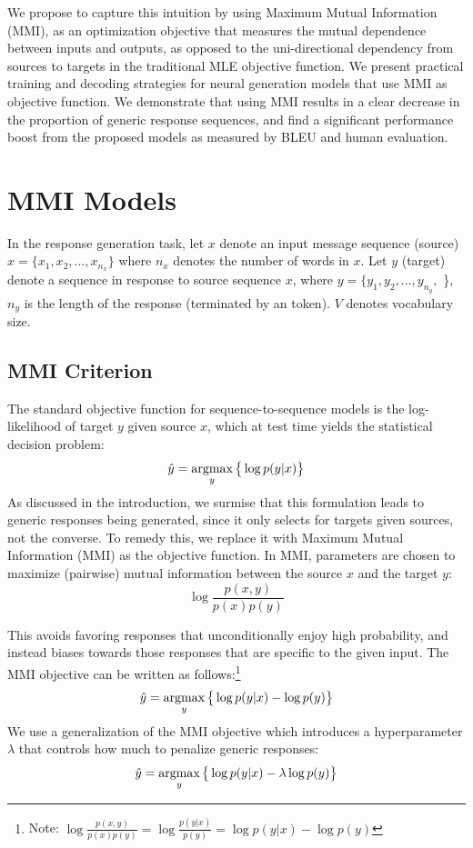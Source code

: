 We propose to capture this intuition by using Maximum Mutual Information (MMI), as an optimization objective that measures the mutual dependence between inputs and outputs, as opposed to 
the uni-directional dependency from sources to targets in the traditional MLE objective function.
We present practical training and decoding strategies for neural generation models that use MMI as objective function.
We demonstrate that using MMI results in a clear decrease in the proportion of generic response sequences, and 
find a significant performance boost from the proposed models as measured by  BLEU \cite{papineni2002bleu} and human evaluation.


\section{MMI Models}
In the response generation task,
let $x$ denote an input message sequence (source) $x=\{x_1,x_2,...,x_{n_x}\}$ where $n_x$ denotes the number of words in $x$.
Let $y$ (target) denote a sequence in response to source sequence $x$, where $y=\{y_1,y_2,...,y_{n_y},$ \eos{}\}, $n_y$ is the length of the response (terminated by an \eos token). $V$ denotes vocabulary size. 

\subsection{MMI Criterion}
The standard objective function for sequence-to-sequence models is the log-likelihood of target $y$ given source $x$, which at test time yields the statistical decision problem:
\begin{equation}
\hat{y}= \mathop{\text{argmax}}_y \big\{\log p(y|x)\big\}
\label{eqseq2seq}
\end{equation}
As discussed in the introduction, we surmise that this formulation leads to generic responses being generated, since it only selects for targets given sources, not the converse. 
To remedy this, we replace it with Maximum Mutual Information (MMI) as the objective function. 
In MMI, parameters are chosen to maximize (pairwise) mutual information
between the source $x$ and the target $y$:
\begin{equation}
\log \frac{p(x,y)}{p(x)p(y)}
\label{eq1}
\end{equation}

This avoids favoring responses that unconditionally enjoy high probability, and instead biases towards those responses that are specific to the given input.
The MMI objective can be written as follows:\footnote{Note: $\log\frac{p(x,y)}{p(x)p(y)} = \log\frac{p(y|x)}{p(y)} = \log p(y|x) - \log p(y)$}
\begin{equation*}
\begin{aligned}
\hat{y} = \mathop{\text{argmax}}_{y} \big\{\log p(y|x) - \log p(y)\big\}
\end{aligned}
\end{equation*}
%
We use a generalization of the MMI objective which introduces a hyperparameter $\lambda$ that controls how much to penalize generic responses:
\begin{equation}
\hat{y}  =\mathop{\text{argmax}}_{y} \big\{\log p(y|x) - \lambda\log p(y)\big\}
\label{eqweightedmmi}
\end{equation}

